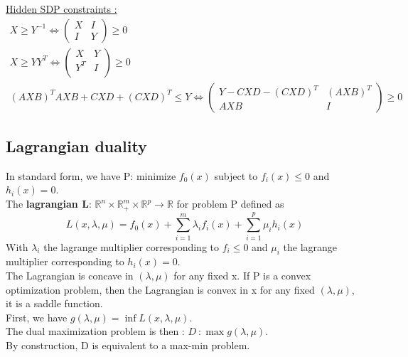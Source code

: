 \documentclass[../main.tex]{subfiles}
\begin{document}
\quad \underline{Hidden SDP constraints :}\\
\begin{equation}
    \begin{gathered}
        X \geq Y^{-1} \Leftrightarrow \begin{pmatrix}
            X & I \\ I & Y
        \end{pmatrix} \geq 0\\
        X \geq YY^T \Leftrightarrow \begin{pmatrix}
            X & Y\\ Y^T & I\\
        \end{pmatrix} \geq 0\\
        (AXB)^TAXB + CXD + (CXD)^T \leq Y \Leftrightarrow \begin{pmatrix}
            Y - CXD - (CXD)^T & (AXB)^T\\
            AXB & I 
        \end{pmatrix} \geq 0
    \end{gathered}
\end{equation}

\subsection{Lagrangian duality}

In standard form, we have P: minimize $f_0(x)$ subject to $f_i(x) \leq 0$ and $h_i(x) = 0$.\\

The \textbf{lagrangian L}: $\mathbb{R}^n\times \mathbb{R}_+^m\times \mathbb{R}^p \rightarrow \mathbb{R}$ for problem P defined as \begin{equation}
    L(x, \lambda, \mu) = f_0(x) + \sum_{i=1}^m \lambda_i f_i(x) + \sum_{i=1}^p \mu_i h_i(x)
\end{equation}
With $\lambda_i$ the lagrange multiplier corresponding to $f_i \leq 0$ and $\mu_i$ the lagrange multiplier corresponding to $h_i(x) = 0$.\\

The Lagrangian is concave in $(\lambda, \mu)$ for any fixed x. If P is a convex optimization problem, then the Lagrangian is convex in x for any fixed $(\lambda, \mu)$, it is a saddle function.\\

First, we have $g(\lambda, \mu) = \inf L(x, \lambda, \mu)$.\\
The dual maximization problem is then : $D \: : \max g(\lambda, \mu) $.\\
By construction, D is equivalent to a max-min problem. 
\end{document}
